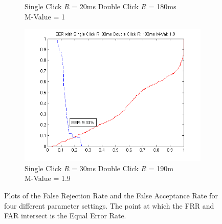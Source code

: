 \documentclass[conference]{IEEEtran}
\begin{document}
\begin{figure}[p]
\begin{subfigure}{.5\textwidth}
  \caption{Single Click $R$ = 20ms Double Click $R$ = 180ms\\M-Value = 1}
  \label{fig:sfig3}
\end{subfigure}%
\begin{subfigure}{.5\textwidth}
  \centering
  \includegraphics[width=.8\linewidth]{19M}
  \caption{Single Click $R$ = 30ms Double Click $R$ = 190m\\ M-Value = 1.9}
  \label{fig:sfig4}
\end{subfigure}
\caption{Plots of the False Rejection Rate and the False Acceptance Rate for four different parameter settings. The point at which the FRR and FAR intersect is the Equal Error Rate. }
\label{fig:fig}
\end{figure}
\end{document}

